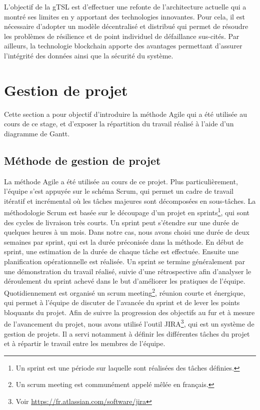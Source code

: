\documentclass{tnreport}
\begin{document}
L'objectif de la gTSL est d'effectuer une refonte de l'architecture actuelle qui a montré ses limites en y apportant des technologies innovantes. Pour cela, il est nécessaire d'adopter un modèle décentralisé et distribué qui permet de résoudre les problèmes de résilience et de point individuel de défaillance sus-cités. Par ailleurs, la technologie blockchain apporte des avantages permettant d'assurer l'intégrité des données ainsi que la sécurité du système.

\section{Gestion de projet}

Cette section a pour objectif d'introduire la méthode Agile qui a été utilisée au cours de ce stage, et d'exposer la répartition du travail réalisé à l'aide d'un diagramme de Gantt.

\subsection{Méthode de gestion de projet}

La méthode Agile a été utilisée au cours de ce projet. 
Plus particulièrement, l'équipe s'est appuyée sur le schéma Scrum, qui permet un cadre de travail itératif et incrémental où les tâches majeures sont décomposées en sous-tâches.
La méthodologie Scrum est basée sur le découpage d'un projet en sprints\footnote{Un sprint est une période sur laquelle sont réalisées des tâches définies.}, qui sont des cycles de livraison très courts.
Un sprint peut s'étendre sur une durée de quelques heures à un mois. 
Dans notre cas, nous avons choisi une durée de deux semaines par sprint, qui est la durée préconisée dans la méthode.
En début de sprint, une estimation de la durée de chaque tâche est effectuée. Ensuite une planification opérationnelle est réalisée.
Un sprint se termine généralement par une démonstration du travail réalisé, suivie d'une rétrospective afin d'analyser le déroulement du sprint achevé dans le but d'améliorer les pratiques de l'équipe. 
Quotidiennement est organisé un scrum meeting\footnote{Un scrum meeting est communément appelé mêlée en français.}, réunion courte et énergique, qui permet à l'équipe de discuter de l'avancée du sprint et de lever les points bloquants du projet.
Afin de suivre la progression des objectifs au fur et à mesure de l’avancement du projet, nous avons utilisé l'outil JIRA\footnote{Voir \url{https://fr.atlassian.com/software/jira}}, qui est un système de gestion de projets. Il a servi notamment à définir les différentes tâches du projet et à répartir le travail entre les membres de l’équipe.
\end{document}
